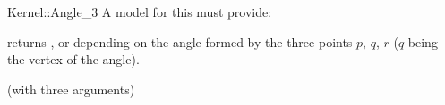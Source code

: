 \begin{ccRefFunctionObjectConcept}{Kernel::Angle_3}
A model for this must provide:


{returns ,  or  depending
on the angle formed by the three points $p$, $q$, $r$ ($q$ being the vertex of
the angle).}

\ccRefines
{} (with three arguments)

\ccSeeAlso
{} \\

\end{ccRefFunctionObjectConcept}
